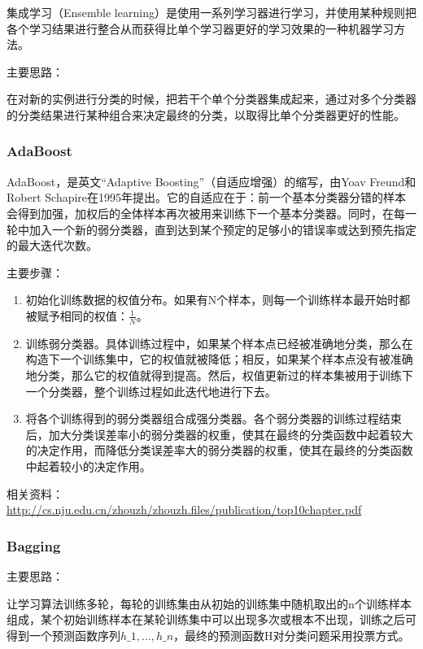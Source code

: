 \documentclass[12pt]{article}
\begin{document}
集成学习（Ensemble learning）是使用一系列学习器进行学习，并使用某种规则把各个学习结果进行整合从而获得比单个学习器更好的学习效果的一种机器学习方法。

{\color{blue}主要思路}：

在对新的实例进行分类的时候，把若干个单个分类器集成起来，通过对多个分类器的分类结果进行某种组合来决定最终的分类，以取得比单个分类器更好的性能。

\subsubsection{AdaBoost}

AdaBoost，是英文``Adaptive Boosting''（自适应增强）的缩写，由Yoav Freund和Robert Schapire在1995年提出。它的自适应在于：前一个基本分类器分错的样本会得到加强，加权后的全体样本再次被用来训练下一个基本分类器。同时，在每一轮中加入一个新的弱分类器，直到达到某个预定的足够小的错误率或达到预先指定的最大迭代次数。

{\color{blue}主要步骤}：
\begin{enumerate}
    \item 初始化训练数据的权值分布。如果有N个样本，则每一个训练样本最开始时都被赋予相同的权值：$\frac{1}{N}$。
    \item 训练弱分类器。具体训练过程中，如果某个样本点已经被准确地分类，那么在构造下一个训练集中，它的权值就被降低；相反，如果某个样本点没有被准确地分类，那么它的权值就得到提高。然后，权值更新过的样本集被用于训练下一个分类器，整个训练过程如此迭代地进行下去。
    \item 将各个训练得到的弱分类器组合成强分类器。各个弱分类器的训练过程结束后，加大分类误差率小的弱分类器的权重，使其在最终的分类函数中起着较大的决定作用，而降低分类误差率大的弱分类器的权重，使其在最终的分类函数中起着较小的决定作用。
\end{enumerate}

相关资料：\url{http://cs.nju.edu.cn/zhouzh/zhouzh.files/publication/top10chapter.pdf}

\subsubsection{Bagging}

{\color{blue}主要思路}：

让学习算法训练多轮，每轮的训练集由从初始的训练集中随机取出的n个训练样本组成，某个初始训练样本在某轮训练集中可以出现多次或根本不出现，训练之后可得到一个预测函数序列$h\_1, \dots, h\_n$，最终的预测函数H对分类问题采用投票方式。
\end{document}

